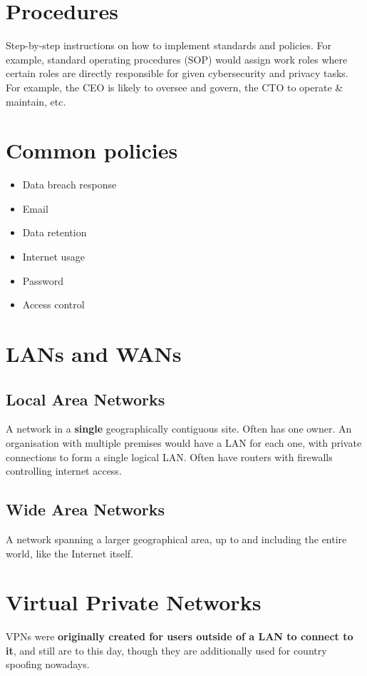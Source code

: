 \documentclass[12pt]{report}
\begin{document}
\section{Procedures}
Step-by-step instructions on how to implement standards and policies.  For example, standard operating procedures (SOP) would assign work roles where certain roles are directly responsible for given cybersecurity and privacy tasks. For example, the CEO is likely to oversee and govern, the CTO to operate \& maintain, etc.

\section{Common policies}
\begin{multicols}{3}
\begin{itemize}
	\item Data breach response
	\item Email
	\item Data retention
	\item Internet usage
	\item Password
	\item Access control
\end{itemize}
\end{multicols}

\section{LANs and WANs}
\subsection{Local Area Networks}
A network in a \textbf{single} geographically contiguous site. Often has one owner. An organisation with multiple premises would have a LAN for each one, with private connections to form a single logical LAN. Often have routers with firewalls controlling internet access.

\subsection{Wide Area Networks}
A network spanning a larger geographical area, up to and including the entire world, like the Internet itself.

\section{Virtual Private Networks}
VPNs were \textbf{originally created for users outside of a LAN to connect to it}, and still are to this day, though they are additionally used for country spoofing nowadays.
\end{document}
